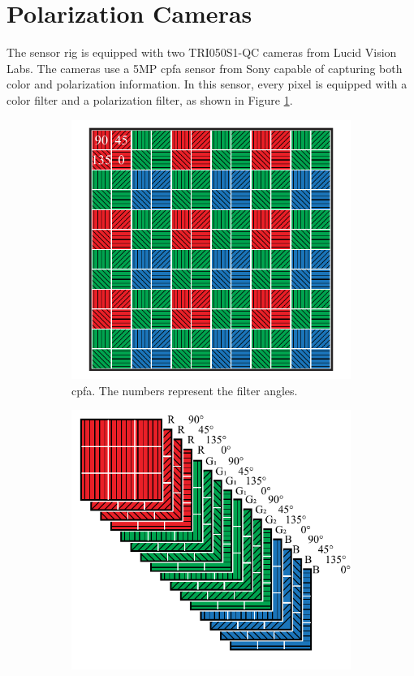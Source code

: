 \section{Polarization Cameras}
The sensor rig is equipped with two TRI050S1-QC cameras from Lucid Vision Labs.
The cameras use a 5MP \gls{cpfa} sensor from Sony capable of capturing both color and polarization information. 
In this sensor, every pixel is equipped with a color filter and a polarization filter, as shown in Figure \ref{fig:cpfa}.

\begin{figure}[H]
    \begin{subfigure}[B]{.48\textwidth}
        \centering
        \includegraphics[width=\textwidth]{figures/sensor_layout.pdf}
        \caption{\gls{cpfa}. The numbers represent the filter angles.\label{fig:cpfa}}
    \end{subfigure}
    \hfill
    \begin{subfigure}[B]{.48\textwidth}
        \includegraphics[width=\textwidth]{figures/sensor_packaging.pdf}

\end{subfigure}
\end{figure}
